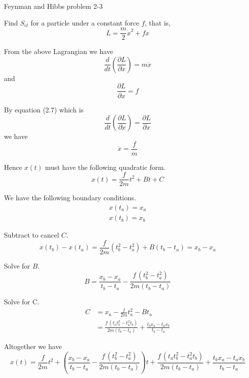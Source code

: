 \documentclass[12pt]{article}
\begin{document}
Feynman and Hibbs problem 2-3

\bigskip
Find $S_{cl}$ for a particle under a constant force $f$, that is,
\begin{equation*}
L=\frac{m}{2}\dot x^2+fx
\end{equation*}

From the above Lagrangian we have
\begin{equation*}
\frac{d}{dt}\left(\frac{\partial L}{\partial\dot x}\right)=m\ddot x
\end{equation*}
and
\begin{equation*}
\frac{\partial L}{\partial x}=f
\end{equation*}

By equation (2.7) which is
\begin{equation*}
\frac{d}{dt}\left(\frac{\partial L}{\partial\dot x}\right)=\frac{\partial L}{\partial x}
\end{equation*}
we have
\begin{equation*}
\ddot x=\frac{f}{m}
\end{equation*}

Hence $x(t)$ must have the following quadratic form.
\begin{equation*}
x(t)=\frac{f}{2m}t^2+Bt+C
\end{equation*}

We have the following boundary conditions.
\begin{align*}
x(t_a)=x_a\\
x(t_b)=x_b
\end{align*}

Subtract to cancel $C$.
\begin{equation*}
x(t_b)-x(t_a)=\frac{f}{2m}\left(t_b^2-t_a^2\right)+B(t_b-t_a)=x_b-x_a
\end{equation*}

Solve for $B$.
\begin{equation*}
B=\frac{x_b-x_a}{t_b-t_a}-\frac{f\,\left(t_b^2-t_a^2\right)}{2m(t_b-t_a)}
\end{equation*}

Solve for C.
\begin{align*}
C&=x_a-\frac{f}{2m}t_a^2-Bt_a
\\[1ex]
&=\frac{f\,\left(t_a t_b^2 - t_a^2 t_b\right)}{2 m (t_b - t_a)} + \frac{t_b x_a - t_a x_b}{t_b - t_a}
\end{align*}

Altogether we have
\begin{equation*}
x(t)=
\frac{f}{2m}t^2
+\left(\frac{x_b-x_a}{t_b-t_a}-\frac{f\,\left(t_b^2-t_a^2\right)}{2m(t_b-t_a)}\right)t
+\frac{f\,\left(t_a t_b^2 - t_a^2 t_b\right)}{2 m (t_b - t_a)} + \frac{t_b x_a - t_a x_b}{t_b - t_a}
\tag{1}
\end{equation*}
\end{document}
